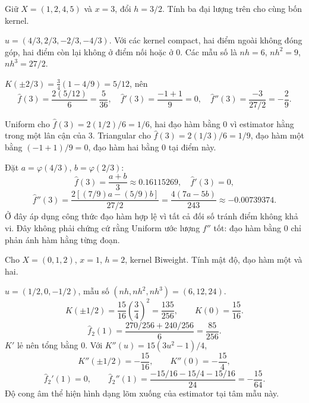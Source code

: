 \begin{exercise}
Giữ $X=(1,2,4,5)$ và $x=3$, đổi $h=3/2$. Tính ba đại lượng trên
cho cùng bốn kernel.
\end{exercise}
\begin{solution}
$u=(4/3,2/3,-2/3,-4/3)$. Với các kernel compact, hai điểm ngoài
không đóng góp, hai điểm còn lại không ở điểm nối hoặc ở 0.
Các mẫu số là $nh=6$, $nh^2=9$, $nh^3=27/2$.

$K(\pm2/3)=\frac34(1-4/9)=5/12$, nên
\[
\widehat f(3)=\frac{2(5/12)}6=\boxed{\frac5{36}},\quad
\widehat f'(3)=\frac{-1+1}{9}=\boxed0,\quad
\widehat f''(3)=\frac{-3}{27/2}=\boxed{-\frac29}.
\]

Uniform cho $\widehat f(3)=2(1/2)/6=\boxed{1/6}$,
hai đạo hàm bằng 0 vì estimator hằng trong một lân cận của 3.
Triangular cho $\widehat f(3)=2(1/3)/6=\boxed{1/9}$,
đạo hàm một bằng $(-1+1)/9=0$, đạo hàm hai bằng 0 tại điểm này.

Đặt $a=\varphi(4/3)$, $b=\varphi(2/3)$:
\[
\widehat f(3)=\boxed{\frac{a+b}{3}}\approx0.16115269,\quad
\widehat f'(3)=\boxed0,
\]
\[
\widehat f''(3)=\frac{2[(7/9)a-(5/9)b]}{27/2}
=\boxed{\frac{4(7a-5b)}{243}}\approx-0.00739374.
\]
Ở đây áp dụng công thức đạo hàm hợp lệ vì tất cả đối số tránh điểm
không khả vi. Đây không phải chứng cứ rằng Uniform ước lượng $f''$ tốt:
đạo hàm bằng 0 chỉ phản ánh hàm hằng từng đoạn.
\end{solution}

\begin{exercise}
Cho $X=(0,1,2)$, $x=1$, $h=2$, kernel Biweight.
Tính mật độ, đạo hàm một và hai.
\end{exercise}
\begin{solution}
$u=(1/2,0,-1/2)$, mẫu số $(nh,nh^2,nh^3)=(6,12,24)$.
\[
K(\pm1/2)=\frac{15}{16}\left(\frac34\right)^2=\frac{135}{256},
\qquad K(0)=\frac{15}{16}.
\]
\[
\widehat f_2(1)=\frac{270/256+240/256}{6}
=\boxed{\frac{85}{256}}.
\]
$K'$ lẻ nên tổng bằng 0. Với $K''(u)=15(3u^2-1)/4$,
\[
K''(\pm1/2)=-\frac{15}{16},\qquad K''(0)=-\frac{15}{4},
\]
\[
\boxed{\widehat f_2'(1)=0,\qquad
\widehat f_2''(1)=\frac{-15/16-15/4-15/16}{24}
=-\frac{15}{64}.}
\]
Độ cong âm thể hiện hình dạng lõm xuống của estimator tại tâm mẫu này.
\end{solution}

